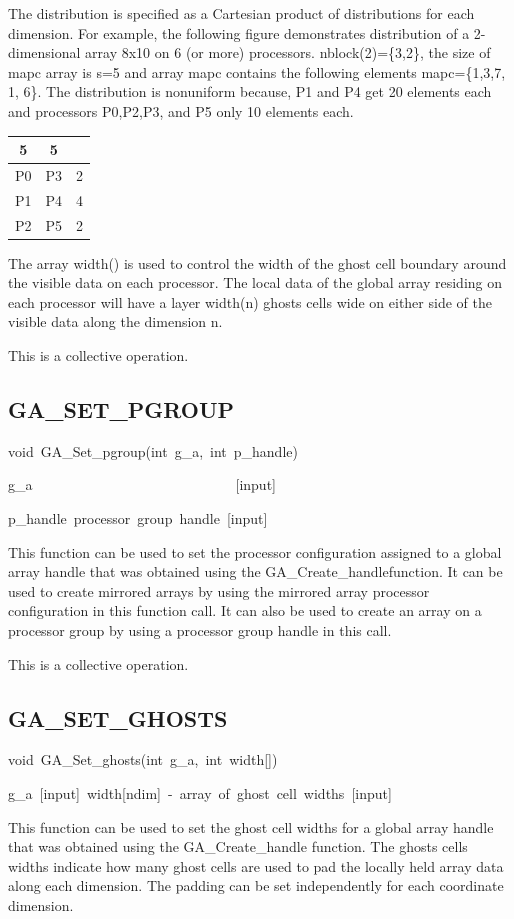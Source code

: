 The distribution is specified as a Cartesian product of distributions
for each dimension. For example, the following figure demonstrates
distribution of a 2-dimensional array 8x10 on 6 (or more) processors.
nblock(2)=\{3,2\}, the size of mapc array is s=5 and array mapc contains
the following elements mapc=\{1,3,7, 1, 6\}. The distribution is nonuniform
because, P1 and P4 get 20 elements each and processors P0,P2,P3, and
P5 only 10 elements each. 

\begin{tabular}{|c|c|c|}
\cline{1-2} 
5 & 5 & \multicolumn{1}{c}{}\tabularnewline
\hline 
P0 & P3 & 2\tabularnewline
\hline 
P1 & P4 & 4\tabularnewline
\hline 
P2 & P5 & 2\tabularnewline
\hline
\end{tabular} 

The array width() is used to control the width of the ghost cell boundary
around the visible data on each processor. The local data of the global
array residing on each processor will have a layer width(n) ghosts
cells wide on either side of the visible data along the dimension
n.

This is a collective operation. 


\subsection*{\label{sub:GA_SET_PGROUP}GA\_SET\_PGROUP}
\begin{lyxcode}
void~GA\_Set\_pgroup(int~g\_a,~int~p\_handle)



g\_a~~~~~~~~~~~~~~~~~~~~~~~~~~~~~{[}input{]}~

p\_handle~processor~group~handle~{[}input{]}
\end{lyxcode}
This function can be used to set the processor configuration assigned
to a global array handle that was obtained using the GA\_Create\_handlefunction.
It can be used to create mirrored arrays by using the mirrored array
processor configuration in this function call. It can also be used
to create an array on a processor group by using a processor group
handle in this call.

This is a collective operation. 


\subsection*{\label{sub:GA_SET_GHOSTS}GA\_SET\_GHOSTS}
\begin{lyxcode}
void~GA\_Set\_ghosts(int~g\_a,~int~width{[}{]})



g\_a~{[}input{]}~width{[}ndim{]}~-~array~of~ghost~cell~widths~{[}input{]}
\end{lyxcode}
This function can be used to set the ghost cell widths for a global
array handle that was obtained using the GA\_Create\_handle function.
The ghosts cells widths indicate how many ghost cells are used to
pad the locally held array data along each dimension. The padding
can be set independently for each coordinate dimension.

